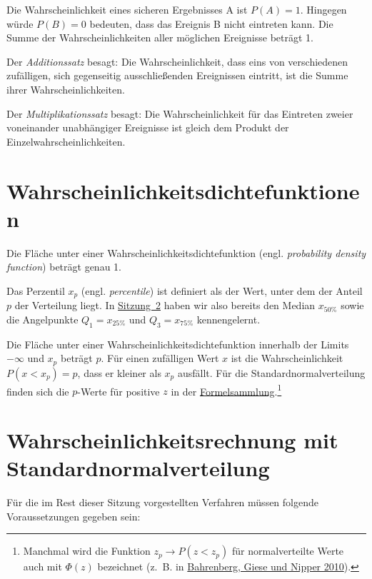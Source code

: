 \documentclass[
  11pt,
  ngerman,
  a4paper,
]{report}
\begin{document}
Die Wahrscheinlichkeit eines sicheren Ergebnisses A ist \(P(A) = 1\). Hingegen würde \(P(B) = 0\) bedeuten, dass das Ereignis B nicht eintreten kann. Die Summe der Wahrscheinlichkeiten aller möglichen Ereignisse beträgt 1.

Der \emph{Additionssatz} besagt: Die Wahrscheinlichkeit, dass eins von verschiedenen zufälligen, sich gegenseitig ausschließenden Ereignissen eintritt, ist die Summe ihrer Wahrscheinlichkeiten.

Der \emph{Multiplikationssatz} besagt: Die Wahrscheinlichkeit für das Eintreten zweier voneinander unabhängiger Ereignisse ist gleich dem Produkt der Einzelwahrscheinlichkeiten.

\hypertarget{wahrscheinlichkeitsdichtefunktionen}{%
\section{Wahrscheinlichkeitsdichtefunktionen}\label{wahrscheinlichkeitsdichtefunktionen}}

Die Fläche unter einer Wahrscheinlichkeitsdichtefunktion (engl. \emph{probability density function}) beträgt genau 1.

Das Perzentil \(x_p\) (engl. \emph{percentile}) ist definiert als der Wert, unter dem der Anteil \(p\) der Verteilung liegt. In \protect\hyperlink{Mauxdfzahlen}{Sitzung~2} haben wir also bereits den Median \(x_{50\%}\) sowie die Angelpunkte \(Q_1=x_{25\%}\) und \(Q_3=x_{75\%}\) kennengelernt.

Die Fläche unter einer Wahrscheinlichkeitsdichtefunktion innerhalb der Limits \(-\infty\) und \(x_p\) beträgt \(p\). Für einen zufälligen Wert \(x\) ist die Wahrscheinlichkeit \(P(x < x_p) = p\), dass er kleiner als \(x_p\) ausfällt.
Für die Standardnormalverteilung finden sich die \(p\)-Werte für positive \(z\) in der \href{Formelsammlung\%20und\%20Wertetabellen.pdf}{Formelsammlung}.\footnote{Manchmal wird die Funktion \(z_p \rightarrow P(z < z_p)\) für normalverteilte Werte auch mit \(\Phi(z)\) bezeichnet (z.~B. in \protect\hyperlink{ref-bahrenberg}{Bahrenberg, Giese und Nipper 2010}).}

\hypertarget{wahrscheinlichkeitsrechnung-mit-standardnormalverteilung}{%
\section{Wahrscheinlichkeitsrechnung mit Standardnormalverteilung}\label{wahrscheinlichkeitsrechnung-mit-standardnormalverteilung}}

Für die im Rest dieser Sitzung vorgestellten Verfahren müssen folgende Voraussetzungen gegeben sein:
\end{document}
